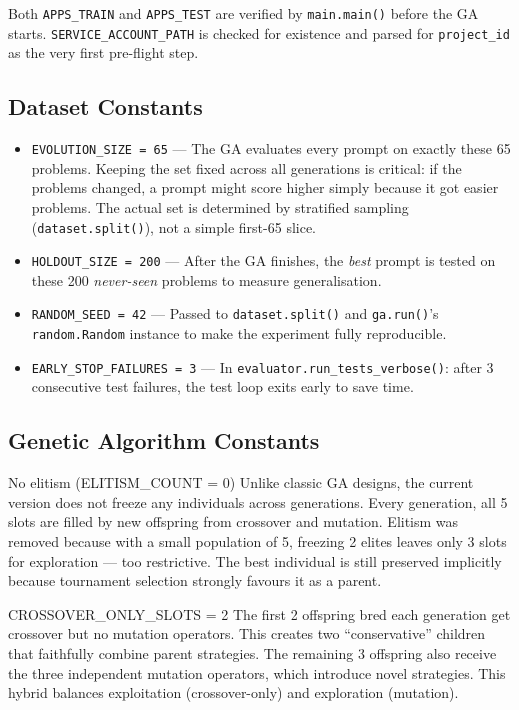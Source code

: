\documentclass[11pt,a4paper]{report}
\newcommand{\fn}[1]{\texttt{#1}}
\begin{document}
Both \fn{APPS\_TRAIN} and \fn{APPS\_TEST} are verified by \fn{main.main()} before the GA
starts.  \fn{SERVICE\_ACCOUNT\_PATH} is checked for existence and parsed for \fn{project\_id}
as the very first pre-flight step.

\subsection{Dataset Constants}

\begin{itemize}[nosep]
  \item \fn{EVOLUTION\_SIZE = 65} --- The GA evaluates every prompt on exactly these
    65 problems.  Keeping the set fixed across all generations is critical: if the
    problems changed, a prompt might score higher simply because it got easier problems.
    The actual set is determined by stratified sampling (\fn{dataset.split()}), not a
    simple first-65 slice.
  \item \fn{HOLDOUT\_SIZE = 200} --- After the GA finishes, the \emph{best} prompt is
    tested on these 200 \emph{never-seen} problems to measure generalisation.
  \item \fn{RANDOM\_SEED = 42} --- Passed to \fn{dataset.split()} and \fn{ga.run()}'s
    \texttt{random.Random} instance to make the experiment fully reproducible.
  \item \fn{EARLY\_STOP\_FAILURES = 3} --- In \fn{evaluator.run\_tests\_verbose()}: after
    3 consecutive test failures, the test loop exits early to save time.
\end{itemize}

\subsection{Genetic Algorithm Constants}

\begin{conceptbox}{No elitism (ELITISM\_COUNT = 0)}
Unlike classic GA designs, the current version does not freeze any individuals across
generations.  Every generation, all 5 slots are filled by new offspring from crossover
and mutation.  Elitism was removed because with a small population of 5, freezing 2
elites leaves only 3 slots for exploration --- too restrictive.  The best individual
is still preserved implicitly because tournament selection strongly favours it as a
parent.
\end{conceptbox}

\begin{conceptbox}{CROSSOVER\_ONLY\_SLOTS = 2}
The first 2 offspring bred each generation get crossover but no mutation operators.
This creates two ``conservative'' children that faithfully combine parent strategies.
The remaining 3 offspring also receive the three independent mutation operators, which
introduce novel strategies.  This hybrid balances exploitation (crossover-only) and
exploration (mutation).
\end{conceptbox}
\end{document}
